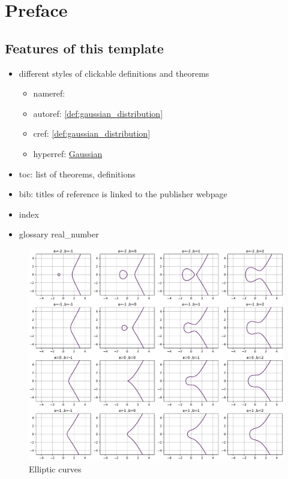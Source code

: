 \chapter{Preface}

\section{Features of this template}

\begin{itemize}
    \item different styles of clickable definitions and theorems
    \begin{itemize}
        \item nameref:

        \item autoref:
            \autoref{def:gaussian_distribution}

        \item cref:
            \cref{def:gaussian_distribution}

        \item hyperref:
            \hyperref[def:gaussian_distribution]{Gaussian}
    \end{itemize}

    \item toc: list of theorems, definitions
    \item bib: titles of reference is linked to the publisher webpage 
        \cite{kitaev2002classical}
        \cite{childsUniversalComputationQuantum2009}
    \item index
    \item glossary
    \gls{real_number}
\end{itemize}

\begin{figure}[!ht]
    \centering
    \includegraphics[width=1\linewidth]{./figure/elliptic_curves.pdf}
    \caption{Elliptic curves}
\end{figure}
